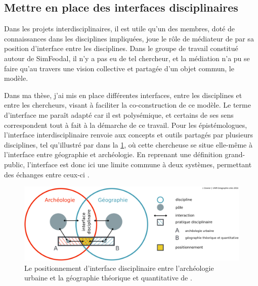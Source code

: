 \subsection{Mettre en place des interfaces disciplinaires\label{subsec:interfaces}}

Dans les projets interdisciplinaires, il est utile qu'un des membres, doté de connaissances dans les disciplines impliquées, joue le rôle de médiateur de par sa position d'interface entre les disciplines.
Dans le groupe de travail constitué autour de SimFeodal, il n'y a pas eu de tel chercheur, et la médiation n'a pu se faire qu'au travers une vision collective et partagée d'un objet commun, le modèle.

Dans ma thèse, j'ai mis en place différentes \og interfaces\fg{}, entre les disciplines et entre les chercheurs, visant à faciliter la co-construction de ce modèle.
Le terme d'interface me paraît adapté car il est polysémique, et certains de ses sens correspondent tout à fait à la démarche de ce travail.
Pour les épistémologues, l'interface interdisciplinaire renvoie aux concepts et outils partagés par plusieurs disciplines, tel qu'illustré par \textcite{gravier_deux_2018} dans la \cref{fig:interfaces-julie}, où cette chercheuse se situe elle-même à l'interface entre géographie et archéologie.
En reprenant une définition grand-public, l'interface est donc ici une \og limite commune à deux systèmes, permettant des échanges entre ceux-ci\fg{} \autocite{larousse_interface_2019}.

\begin{figure}[H]
	\centering
	\includegraphics[width=\linewidth]{img/interfaces_disciplinaires_julie.png}
	\caption[Le \og positionnement d'interface disciplinaire entre l'archéologie urbaine et la géographie théorique et quantitative \fg{} de \textcite{gravier_deux_2018}]{Le \og positionnement d'interface disciplinaire entre l'archéologie urbaine et la géographie théorique et quantitative \fg{} de \textcite[fig. 1.3, \ppno~18]{gravier_deux_2018}.}
	\label{fig:interfaces-julie}
\end{figure}

